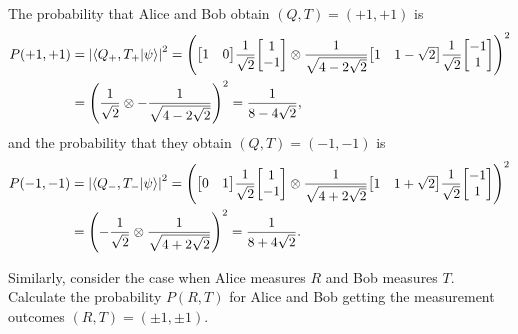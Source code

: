 \begin{solution}
	The probability that Alice and Bob obtain $(Q, T) = (+1, +1)$ is
	\begin{align*}
		P(+1, +1) &= \abs{\braket{Q_+, T_+}{\psi}}^2
		= \left( \mqty[ 1 & 0 ] \frac{1}{\sqrt{2}} \mqty[ 1 \\ -1 ] \otimes \frac{1}{\sqrt{4 - 2 \sqrt{2}}} \mqty[1 & 1 - \sqrt{2} ] \frac{1}{\sqrt{2}} \mqty[ -1 \\ 1 ] \right)^2 \\
		&= \left( \frac{1}{\sqrt{2}} \otimes -\frac{1}{\sqrt{4 - 2 \sqrt{2}}} \right)^2
		= \frac{1}{8 - 4 \sqrt{2}},
	\end{align*}
	and the probability that they obtain $(Q, T) = (-1, -1)$ is
	\begin{align*}
		P(-1, -1) &= \abs{\braket{Q_-, T_-}{\psi}}^2
		= \left( \mqty[ 0 & 1 ] \frac{1}{\sqrt{2}} \mqty[ 1 \\ -1 ] \otimes \frac{1}{\sqrt{4 + 2 \sqrt{2}}} \mqty[1 & 1 + \sqrt{2} ] \frac{1}{\sqrt{2}} \mqty[ -1 \\ 1 ] \right)^2 \\
		&= \left( -\frac{1}{\sqrt{2}} \otimes \frac{1}{\sqrt{4 + 2 \sqrt{2}}} \right)^2
		= \frac{1}{8 + 4 \sqrt{2}}.
	\end{align*}
	\vfix
\end{solution}



\newcommand{\kRp}{\ket{R_+}}
\newcommand{\kRm}{\ket{R_-}}
\newcommand{\kSp}{\ket{S_+}}
\newcommand{\kSm}{\ket{S_-}}

\begin{problem}
	Similarly, consider the case when Alice measures $R$ and Bob measures $T$.  Calculate the probability $P(R, T)$ for Alice and Bob getting the measurement outcomes $(R, T) = (\pm1, \pm1)$.
\end{problem}

